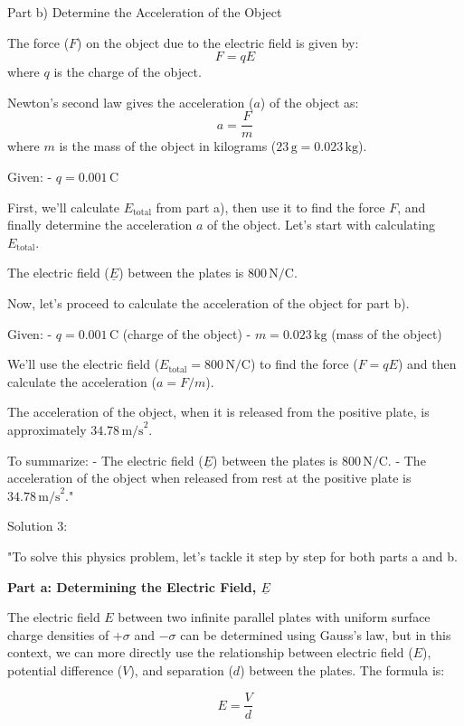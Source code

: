 Part b) Determine the Acceleration of the Object

The force (\( F \)) on the object due to the electric field is given by:
\[ F = qE \]
where \( q \) is the charge of the object.

Newton's second law gives the acceleration (\( a \)) of the object as:
\[ a = \frac{F}{m} \]
where \( m \) is the mass of the object in kilograms (\( 23 \, \text{g} = 0.023 \, \text{kg} \)).

Given:
- \( q = 0.001 \, \text{C} \)

First, we'll calculate \( E_{\text{total}} \) from part a), then use it to find the force \( F \), and finally determine the acceleration \( a \) of the object. Let's start with calculating \( E_{\text{total}} \).

The electric field (\( \underline{E} \)) between the plates is \( 800 \, \text{N/C} \).

Now, let's proceed to calculate the acceleration of the object for part b).

Given:
- \( q = 0.001 \, \text{C} \) (charge of the object)
- \( m = 0.023 \, \text{kg} \) (mass of the object)

We'll use the electric field (\( E_{\text{total}} = 800 \, \text{N/C} \)) to find the force (\( F = qE \)) and then calculate the acceleration (\( a = F/m \)).

The acceleration of the object, when it is released from the positive plate, is approximately \( 34.78 \, \text{m/s}^2 \).

To summarize:
- The electric field (\( \underline{E} \)) between the plates is \( 800 \, \text{N/C} \).
- The acceleration of the object when released from rest at the positive plate is \( 34.78 \, \text{m/s}^2 \)."

Solution 3:

"To solve this physics problem, let's tackle it step by step for both parts a and b.

\textbf{Part a: Determining the Electric Field, \( \underline{E} \)}

The electric field \( E \) between two infinite parallel plates with uniform surface charge densities of \( +\sigma \) and \( -\sigma \) can be determined using Gauss's law, but in this context, we can more directly use the relationship between electric field (\( E \)), potential difference (\( V \)), and separation (\( d \)) between the plates. The formula is:

\[
E = \frac{V}{d}
\]


